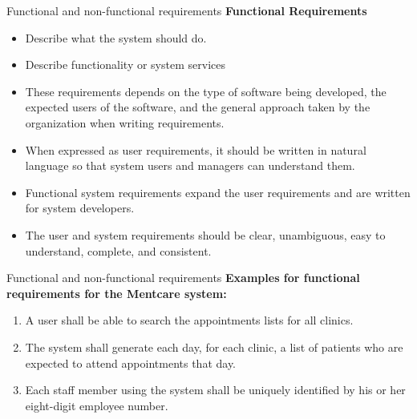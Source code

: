 \documentclass{beamer}
\begin{document}
\begin{frame}{Functional and non-functional requirements}
\textbf{Functional Requirements}
\begin{itemize}
	\item Describe what the system should do.
	\item Describe functionality or system services
	\item These 
	requirements depends on the type of software being developed, the expected 
	users of the software, and the general approach taken by the 
	organization when writing requirements.
	\item When expressed as user requirements, it should be written in natural 
	language so that system users and managers can understand them.
	\item Functional system 
	requirements expand the user requirements and are written for system developers. 
	\item The user and system requirements should 
	be clear, unambiguous, easy to understand, complete, and consistent.

\end{itemize}
\end{frame}
\begin{frame}{Functional and non-functional requirements}
	\textbf{Examples for functional requirements for the Mentcare
		system:}
	\begin{enumerate}
		\item A user shall be able to search the appointments lists for all clinics.
		\item The system shall generate each day, for each clinic, a list of patients 
		who are expected to attend appointments that day.
		\item Each staff member using the system shall be uniquely identified by 
		his or her eight-digit employee number.
	\end{enumerate}
\end{frame}
\end{document}
